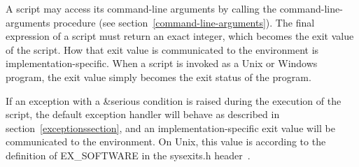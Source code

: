 A script may access its command-line arguments by calling the {\cf
  command-line-arguments} procedure (see
section~\ref{command-line-arguments}).  The final expression of a
script must return an exact integer, which becomes the exit value of
the script.  How that exit value is communicated to the environment is
implementation-specific.  When a script is invoked as a Unix or
Windows program, the exit value simply becomes the exit status of the
program.

If an exception with a {\cf\&serious} condition is raised during the
execution of the script, the default exception handler will behave as
described in section~\ref{exceptionssection}, and an
implementation-specific exit value will be communicated to the
environment.  On Unix, this value is according to the definition of
{\cf EX\_SOFTWARE} in the {\cf sysexits.h} header~\cite{srfi22}.

